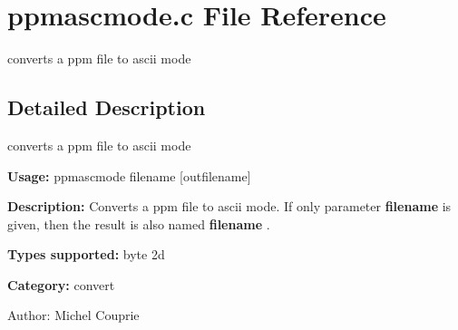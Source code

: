 \section{ppmascmode.c File Reference}
\label{ppmascmode_8c}
converts a ppm file to ascii mode 



\subsection{Detailed Description}
converts a ppm file to ascii mode 

{\bf Usage:} ppmascmode filename [outfilename]

{\bf Description:} Converts a ppm file to ascii mode. If only parameter {\bf filename} is given, then the result is also named {\bf filename} .

{\bf Types supported:} byte 2d

{\bf Category:} convert

\begin{Desc}
\item[Author:]Michel Couprie \end{Desc}
